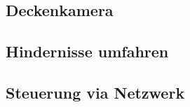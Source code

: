 \subsection{Deckenkamera}
\label{sec:Deckenkamera}

\subsection{Hindernisse umfahren}
\label{sec:Hindernisse}

\subsection{Steuerung via Netzwerk}
\label{sec:Netzwerk}